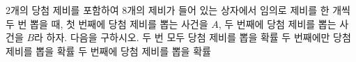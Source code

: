 2개의 당첨 제비를 포함하여 8개의 제비가 들어 있는 상자에서 임의로 제비를 한 개씩 두 번 뽑을 때, 첫 번째에 당첨 제비를 뽑는 사건을 $A$, 두 번째에 당첨 제비를 뽑는 사건을 $B$라 하자. 다음을 구하시오. 
 두 번 모두 당첨 제비를 뽑을 확률
 두 번째에만 당첨 제비를 뽑을 확률
 두 번째에 당첨 제비를 뽑을 확률
